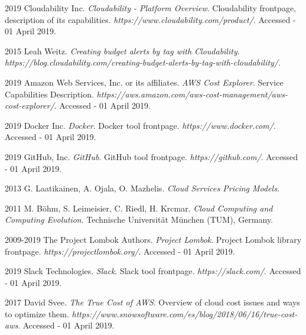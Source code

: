 \documentclass[licencjacka,en]{thesisclass}
\begin{document}
\begin{thebibliography}{99}
        2019 Cloudability Inc.
        \textit{Cloudability - Platform Overview}.
        Cloudability frontpage, description of its capabilities.
        \textit{https://www.cloudability.com/product/}.
        Accessed - 01 April 2019.

        2015 Leah Weitz.
        \textit{Creating budget alerts by tag with Cloudability}.
        \textit{https://blog.cloudability.com/creating-budget-alerts-by-tag-with-cloudability/}.

        2019 Amazon Web Services, Inc. or its affiliates.
        \textit{AWS Cost Explorer}.
        Service Capabilities Description.
        \textit{https://aws.amazon.com/aws-cost-management/aws-cost-explorer/}.
        Accessed - 01 April 2019.

        2019 Docker Inc.
        \textit{Docker}.
        Docker tool frontpage.
        \textit{https://www.docker.com/}.
        Accessed - 01 April 2019.

        2019 GitHub, Inc.
        \textit{GitHub}.
        GitHub tool frontpage.
        \textit{https://github.com/}.
        Accessed - 01 April 2019.

        2013 G. Laatikainen, A. Ojala, O. Mazhelis.
        \textit{Cloud Services Pricing Models}.

        2011 M. Böhm, S. Leimeisier, C. Riedl, H. Krcmar.
        \textit{Cloud Computing and Computing Evolution}.
        Technische Universität München (TUM), Germany.

        2009-2019 The Project Lombok Authors.
        \textit{Project Lombok}.
        Project Lombok library frontpage.
        \textit{https://projectlombok.org/}.
        Accessed - 01 April 2019.

        2019 Slack Technologies.
        \textit{Slack}.
        Slack tool frontpage.
        \textit{https://slack.com/}.
        Accessed - 01 April 2019.

        2017 David Svee.
        \textit{The True Cost of AWS}.
        Overview of cloud cost issues and ways to optimize them.
        \textit{https://www.snowsoftware.com/es/blog/2018/06/16/true-cost-aws}.
        Accessed - 01 April 2019.


\end{thebibliography}
\end{document}
